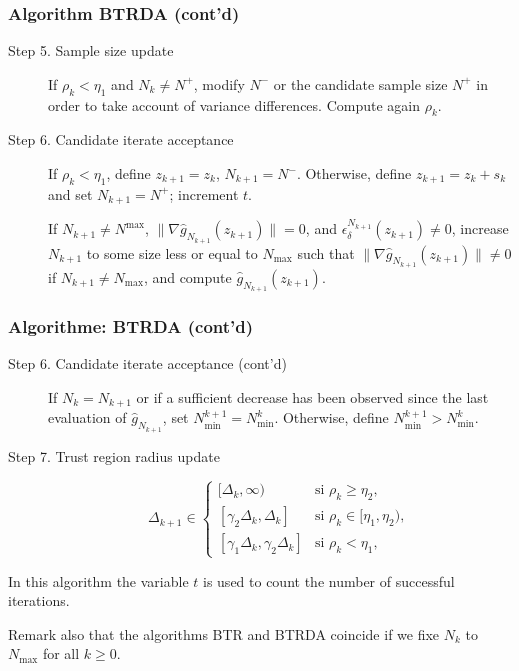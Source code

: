 \documentclass{beamer}
\begin{document}
\begin{frame}
\frametitle{Algorithm BTRDA (cont'd)}

\begin{description}
\item[Step 5. Sample size update]
If $\rho_k < \eta_1$ and $N_k \ne N^+$, modify $N^-$ or the candidate sample size $N^+$ in order to take account of variance differences.
Compute again $\rho_k$.
\item[Step 6. Candidate iterate acceptance]
If $\rho_k < \eta_1$, define $z_{k+1} = z_k$, $N_{k+1} = N^-$.
Otherwise, define $z_{k+1} = z_k + s_k$ and set $N_{k+1} = N^+$;
increment $t$.

If $N_{k+1} \ne N^{\max}$, $\| \nabla \hat{g}_{N_{k+1}}(z_{k+1})\| = 0$, and
$\epsilon_{\delta}^{N_{k+1}}(z_{k+1}) \ne 0$, increase $N_{k+1}$ to some size less or equal to $N_{\max}$ such that $\| \nabla \hat{g}_{N_{k+1}}(z_{k+1})\| \ne 0$ if $N_{k+1} \ne N_{\max}$, and compute $\hat{g}_{N_{k+1}}(z_{k+1})$.
\end{description}

\end{frame}

\begin{frame}
\frametitle{Algorithme: BTRDA (cont'd)}

\begin{description}
\item[Step 6. Candidate iterate acceptance (cont'd)]
If $N_k = N_{k+1}$ or if a sufficient decrease has been observed since the last evaluation of $\hat{g}_{N_{k+1}}$, set $N_{\min}^{k+1} = N_{\min}^k$.
Otherwise, define $N_{\min}^{k+1} > N^k_{\min}$.

\item[Step 7. Trust region radius update]
\[
\Delta_{k+1} \in \begin{cases}
[\Delta_k, \infty) & \mbox{si } \rho_k \geq \eta_2, \\
[\gamma_2 \Delta_k, \Delta_k] & \mbox{si } \rho_k \in [\eta_1, \eta_2),\\
[\gamma_1 \Delta_k, \gamma_2 \Delta_k] & \mbox{si } \rho_k < \eta_1,
\end{cases}
\]
\end{description}

\mbox{}

In this algorithm the variable $t$ is used to count the number of successful iterations.

\mbox{}

Remark also that the algorithms BTR and BTRDA coincide if we fixe $N_k$ to $N_{\max}$ for all $k \geq 0$.

\end{frame}
\end{document}
